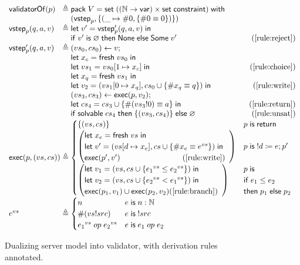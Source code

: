 \begin{figure}
\[\begin{array}{l@{\;}r@{\;}l}
\validatorOf(p)&\triangleq&\existT{V}{\Set((\Nat\to\Var)\times\Set\constraint)}{\\
  &&(\vstep_p,\{(\_\mapsto\#0,\{\#0\equiv0\})\})}\\
\vstep_p(q,a,v)&\triangleq&\letin{v'}{\vstep'_p(q,a,v)}\\
&&\If v'\Is\varnothing\Then\None\Else\Some v'\hfill(\ref{rule:reject})\\
\vstep'_p(q,a,v)&\triangleq&(vs_0,cs_0)\gets v;\\
&&\letin{x_c}{\Fresh vs_0}\\
&&\letin{vs_1}{\update{vs_0}{1}{x_c}}\hfill(\ref{rule:choice})\\
&&\letin{x_q}{\Fresh vs_1}\\
&&\letin{v_2}{(\update{vs_1}{0}{x_q},cs_0\cup\{\#x_q\equiv q\})}\hfill(\ref{rule:write})\\
&&(vs_3,cs_3)\gets\Exec(p,v_2);\\
&&\letin{cs_4}{cs_3\cup\{\#(vs_3!0)\equiv a\}}\hfill(\ref{rule:return})\\
&&\If\solvable cs_4\Then\{(vs_3,cs_4)\}\Else\varnothing\hfill(\ref{rule:unsat})\\
\Exec(p,(vs,cs))&\triangleq&\begin{cases}
  \{(vs,cs)\}&p\Is\Return\\
  \left(\begin{array}{@{}l}
    \letin{x_e}{\Fresh vs}\\
    \letin{v'}{(\update{vs}{d}{x_e},cs\cup\{\#x_e\equiv e^{vs}\})}\\
    \Exec(p',v')\hfill(\ref{rule:write})
  \end{array}\right)&p\Is !d\coloneqq e;p'\\
  \left(\begin{array}{@{}l}
    \letin{v_1}{(vs,cs\cup\{{e_1}^{vs}\le{e_2}^{vs}\})}\\
    \letin{v_2}{(vs,cs\cup\{{e_2}^{vs}<{e_1}^{vs}\})}\\
    \Exec(p_1,v_1)\cup\Exec(p_2,v_2)\hfill(\ref{rule:branch})
  \end{array}\right)&\begin{array}{@{}l}p\Is\\
    \If e_1\le e_2\\
    \tthen p_1\Else p_2\end{array}
\end{cases}\\
e^{vs}&\triangleq&\begin{cases}
  n&e\Is n:\Nat\\
  \#(vs!src)&e\Is!src\\
  {e_1}^{vs}\;op\;{e_2}^{vs}&e\Is e_1\;op\;e_2
\end{cases}
\end{array}\]
\caption[Dualizing server model into validator]{Dualizing server model into
  validator, with derivation rules annotated.}
\label{fig:dualize}
\end{figure}

